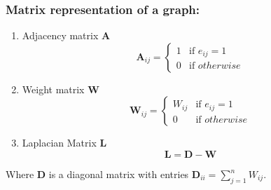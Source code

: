 \documentclass[11pts]{beamer}
\begin{document}
\begin{frame}%
\frametitle{Matrix representation of a graph:}

\begin{enumerate}[\color{bar}\bfseries $\bullet$]
    \item Adjacency matrix $\mathbf{A}$
       \begin{equation*}
        \mathbf{A}_{ij}=\left\{\begin{array}{ccccc}
             1 & \mbox{if } e_{ij}=1\\
             0 & \mbox{if } otherwise
        \end{array}
        \right.
    \end{equation*}
     \item Weight matrix $\mathbf{W}$
       \begin{equation*}
        \mathbf{W}_{ij}=\left\{\begin{array}{ccccc}
             W_{ij} & \mbox{if } e_{ij}=1\\
             0 & \mbox{if } otherwise
        \end{array}
        \right.
    \end{equation*}
    \item Laplacian Matrix $\mathbf{L}$
        \begin{equation*}
        \mathbf{L}=\mathbf{D}-\mathbf{W}
    \end{equation*}
\end{enumerate}

    Where $\mathbf{D}$ is a diagonal matrix with entries $\mathbf{D}_{ii}=\sum_{j=1}^{n}W_{ij}$.
\end{frame}
\end{document}
